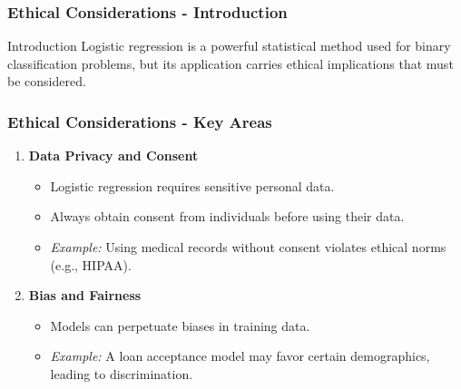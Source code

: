 \documentclass[aspectratio=169]{beamer}
\begin{document}
\begin{frame}[fragile]
    \frametitle{Ethical Considerations - Introduction}
    \begin{block}{Introduction}
        Logistic regression is a powerful statistical method used for binary classification problems, but its application carries ethical implications that must be considered.
    \end{block}
\end{frame}

\begin{frame}[fragile]
    \frametitle{Ethical Considerations - Key Areas}
    \begin{enumerate}
        \item \textbf{Data Privacy and Consent}
            \begin{itemize}
                \item Logistic regression requires sensitive personal data. 
                \item Always obtain consent from individuals before using their data.
                \item \textit{Example:} Using medical records without consent violates ethical norms (e.g., HIPAA).
            \end{itemize}
        \item \textbf{Bias and Fairness}
            \begin{itemize}
                \item Models can perpetuate biases in training data.
                \item \textit{Example:} A loan acceptance model may favor certain demographics, leading to discrimination.
            \end{itemize}
    \end{enumerate}
\end{frame}
\end{document}
